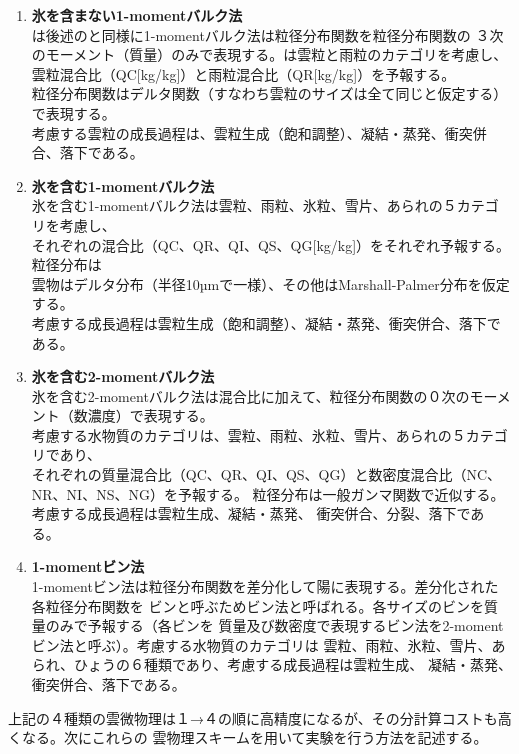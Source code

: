 \begin{enumerate}
\item {\bf 氷を含まない1-momentバルク法\cite{kessler_1969}}\\
\cite{kessler_1969}は後述の\cite{tomita_2008}と同様に1-momentバルク法は粒径分布関数を粒径分布関数の
３次のモーメント（質量）のみで表現する。\cite{kessler_1969}は雲粒と雨粒のカテゴリを考慮し、
雲粒混合比（QC[kg/kg]）と雨粒混合比（QR[kg/kg]）を予報する。\\
粒径分布関数はデルタ関数（すなわち雲粒のサイズは全て同じと仮定する）で表現する。\\
考慮する雲粒の成長過程は、雲粒生成（飽和調整）、凝結・蒸発、衝突併合、落下である。
\item {\bf 氷を含む1-momentバルク法\cite{tomita_2008}}\\
氷を含む1-momentバルク法は雲粒、雨粒、氷粒、雪片、あられの５カテゴリを考慮し、\\
それぞれの混合比（QC、QR、QI、QS、QG[kg/kg]）をそれぞれ予報する。粒径分布は\\
雲物はデルタ分布（半径10µmで一様）、その他はMarshall-Palmer分布を仮定する。\\
考慮する成長過程は雲粒生成（飽和調整）、凝結・蒸発、衝突併合、落下である。
\item {\bf 氷を含む2-momentバルク法\cite{sn_2014}}\\
氷を含む2-momentバルク法は混合比に加えて、粒径分布関数の０次のモーメント（数濃度）で表現する。\\
考慮する水物質のカテゴリは、雲粒、雨粒、氷粒、雪片、あられの５カテゴリであり、\\
それぞれの質量混合比（QC、QR、QI、QS、QG）と数密度混合比（NC、NR、NI、NS、NG）を予報する。
粒径分布は一般ガンマ関数で近似する。考慮する成長過程は雲粒生成、凝結・蒸発、
衝突併合、分裂、落下である。
\item {\bf 1-momentビン法\cite{suzuki_etal_2010}}\\
1-momentビン法は粒径分布関数を差分化して陽に表現する。差分化された各粒径分布関数を
ビンと呼ぶためビン法と呼ばれる。各サイズのビンを質量のみで予報する（各ビンを
質量及び数密度で表現するビン法を2-momentビン法と呼ぶ）。考慮する水物質のカテゴリは
雲粒、雨粒、氷粒、雪片、あられ、ひょうの６種類であり、考慮する成長過程は雲粒生成、
凝結・蒸発、衝突併合、落下である。
\end{enumerate}

上記の４種類の雲微物理は１→４の順に高精度になるが、その分計算コストも高くなる。次にこれらの
雲物理スキームを用いて実験を行う方法を記述する。


